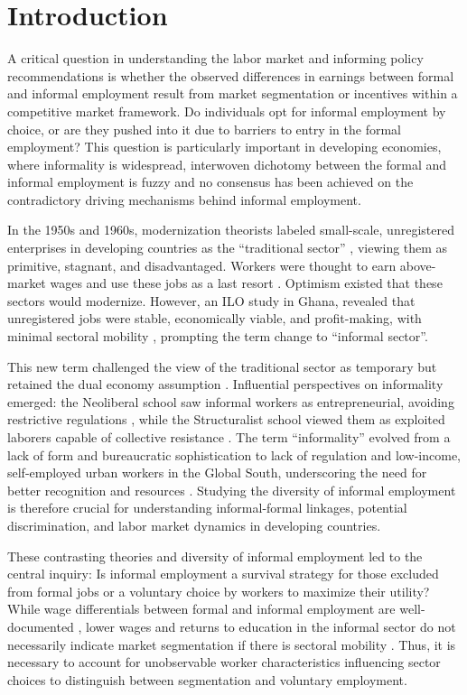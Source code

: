 \section{Introduction}

A critical question in understanding the labor market and informing policy recommendations is whether the observed differences in earnings between formal and informal employment result from market segmentation or incentives within a competitive market framework. Do individuals opt for informal employment by choice, or are they pushed into it due to barriers to entry in the formal employment? This question is particularly important in developing economies, where informality is widespread, interwoven dichotomy between the formal and informal employment is fuzzy and no consensus has been achieved on the contradictory driving mechanisms behind informal employment.

In the 1950s and 1960s, modernization theorists labeled small-scale, unregistered enterprises in developing countries as the ``traditional sector'' \parencite{Lewis1954}, viewing them as primitive, stagnant, and disadvantaged. Workers were thought to earn above-market wages and use these jobs as a last resort \parencite{Harris1970, Fields1990, Fields2005} . Optimism existed that these sectors would modernize. However, an ILO study in Ghana,  \textcite{Hart1973} revealed that unregistered jobs were stable, economically viable, and profit-making, with minimal sectoral mobility \parencite{Sethuraman1981}, prompting the term change to ``informal sector''.

This new term challenged the view of the traditional sector as temporary but retained the dual economy assumption \parencite{Rosaldo2021}. Influential perspectives on informality emerged: the Neoliberal school saw informal workers as entrepreneurial, avoiding restrictive regulations \parencite{DeSoto1989} , while the Structuralist school viewed them as exploited laborers capable of collective resistance \cite{Portes1989, Rosaldo2016}. The term ``informality'' evolved from a lack of form and bureaucratic sophistication to lack of regulation and low-income, self-employed urban workers in the Global South, underscoring the need for better recognition and resources  \parencite{Rosaldo2021}. Studying the diversity of informal employment is therefore crucial for understanding informal-formal linkages, potential discrimination, and labor market dynamics in developing countries.

These contrasting theories and diversity of informal employment led to the central inquiry: Is informal employment a survival strategy for those excluded from formal jobs or a voluntary choice by workers to maximize their utility? While wage differentials between formal and informal employment are well-documented \parencite{Mazumdar1976, Pradhan1995, ElBadaoui2008, Blunch2015}, lower wages and returns to education in the informal sector do not necessarily indicate market segmentation if there is sectoral mobility \parencite{Guenther2012} . Thus, it is necessary to account for unobservable worker characteristics influencing sector choices to distinguish between segmentation and voluntary employment.

